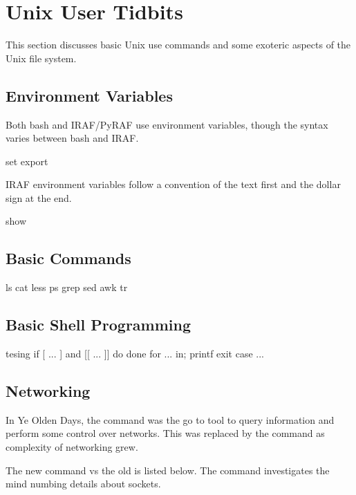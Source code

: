 \section{Unix User Tidbits}


This section discusses basic Unix use commands and some exoteric aspects
of the Unix file system.

\subsection{Environment Variables}

Both bash and IRAF/PyRAF use environment variables, though the syntax varies
between bash and IRAF. 

set
export

IRAF environment variables follow a convention of the text first and
the dollar sign at the end.

show



\subsection{Basic Commands} 

ls
cat
less
ps
grep
sed
awk
tr


\subsection{Basic Shell Programming} \label{sec:BasicShellProgramming}

tesing
   if [ ... ] and [[ ... ]]
do done
for ... in; 
printf
exit
case ...






\subsection{Networking}  \label{sec:UnixUserNetworking}

In Ye Olden Days, the  command was the go to tool to
query information and perform some control over networks. This
was replaced by the  command as complexity of networking
grew.

The new  command vs the old  is listed below.
The   command investigates the mind
numbing details about sockets.

